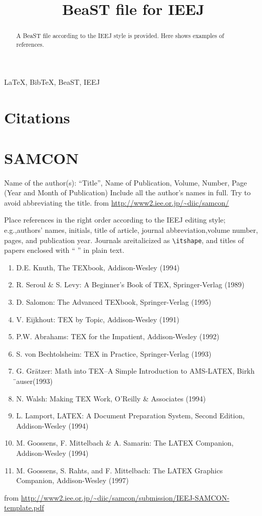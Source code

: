 \documentclass[english]{ieej-e-samcon}
\title{BeaST file for IEEJ}
\begin{document}
\begin{abstract}
A BeaST file according to the IEEJ style is provided.
Here shows examples of references.
\end{abstract}
\begin{keyword}
  \LaTeX, BibTeX, BeaST, IEEJ
\end{keyword}
\maketitle


\section*{Citations}
\Cite{Denki2001,Knuth1994,Yamada2001}

\section{SAMCON}
Name of the author(s): ``Title'', Name of Publication, Volume, Number, Page (Year and Month of Publication)
Include all the author's names in full.
Try to avoid abbreviating the title.
from \url{http://www2.iee.or.jp/~diic/samcon/}

Place references in the right order according to the IEEJ editing style; e.g.,authors' names, initials, title of article, journal abbreviation,volume number, pages, and publication year.
Journals areitalicized as \texttt{\textbackslash itshape}, and titles of papers enclosed with `` '' in plain text.
\footnotesize
\begin{enumerate}
  \item D.E. Knuth, The TEXbook, Addison-Wesley (1994)
  \item R. Seroul \& S. Levy: A Beginner's Book of TEX, Springer-Verlag (1989)
  \item D. Salomon: The Advanced TEXbook, Springer-Verlag (1995)
  \item V. Eijkhout: TEX by Topic, Addison-Wesley (1991)
  \item P.W. Abrahams: TEX for the Impatient, Addison-Wesley (1992)
  \item S. von Bechtolsheim: TEX in Practice, Springer-Verlag (1993)
  \item G. Gr\"atzer: Math into TEX–A Simple Introduction to AMS-LATEX, Birkh ̈auser(1993)
  \item N. Walsh: Making TEX Work, O'Reilly \& Associates (1994)
  \item L. Lamport, LATEX:  A Document Preparation System, Second Edition, Addison-Wesley (1994)
  \item M. Goossens, F. Mittelbach \& A. Samarin: The LATEX Companion, Addison-Wesley (1994)
  \item M. Goossens, S. Rahts, and F. Mittelbach: The LATEX Graphics Companion, Addison-Wesley (1997)
\end{enumerate}
\normalsize
from \url{http://www2.iee.or.jp/~diic/samcon/submission/IEEJ-SAMCON-template.pdf}
\end{document}
